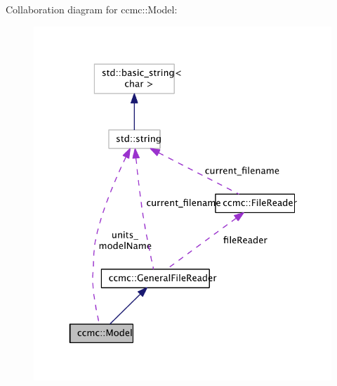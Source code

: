 Collaboration diagram for ccmc\-:\-:Model\-:\nopagebreak
\begin{figure}[H]
\begin{center}
\leavevmode
\includegraphics[width=325pt]{classccmc_1_1_model__coll__graph}
\end{center}
\end{figure}
